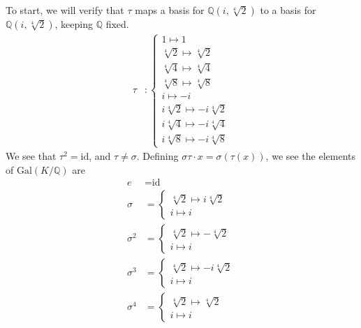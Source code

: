 \documentclass[10pt]{extarticle}
\newcommand{\Q}{\mathbb{Q}}
\begin{document}
\begin{enumerate}[(a)]
      To start, we will verify that $\tau$ maps a basis for $\Q(i,\sqrt[4]{2})$ to a basis for $\Q(i,\sqrt[4]{2})$, keeping $\Q$ fixed.
      \begin{align*}
        \tau &: \begin{cases}
                  1 \mapsto 1\\
                  \sqrt[4]{2} \mapsto \sqrt[4]{2}\\
                  \sqrt[4]{4} \mapsto \sqrt[4]{4}\\
                  \sqrt[4]{8} \mapsto \sqrt[4]{8}\\
                  i\mapsto -i\\
                  i\sqrt[4]{2} \mapsto -i\sqrt[4]{2}\\
                  i\sqrt[4]{4} \mapsto -i\sqrt[4]{4}\\
                  i\sqrt[4]{8} \mapsto -i\sqrt[4]{8}
                \end{cases}
      \end{align*}
      We see that $\tau^2 = \text{id}$, and $\tau \neq \sigma$. Defining $\sigma\tau\cdot x = \sigma(\tau(x))$, we see the elements of $\text{Gal}(K/\Q)$ are
      \begin{align*}
        e &= \text{id}\\
        \sigma &= \begin{cases}
                    \sqrt[4]{2} \mapsto i\sqrt[4]{2}\\
                    i \mapsto i
                  \end{cases}\\
          \sigma^2 &= \begin{cases}
                    \sqrt[4]{2} \mapsto -\sqrt[4]{2}\\
                    i \mapsto i
                  \end{cases}\\
            \sigma^3 &= \begin{cases}
                    \sqrt[4]{2} \mapsto -i\sqrt[4]{2}\\
                    i \mapsto i
                  \end{cases}\\
            \sigma^4 &= \begin{cases}
                    \sqrt[4]{2} \mapsto \sqrt[4]{2}\\
                    i \mapsto i
                  \end{cases}\\

\end{align*}
\end{enumerate}
\end{document}
